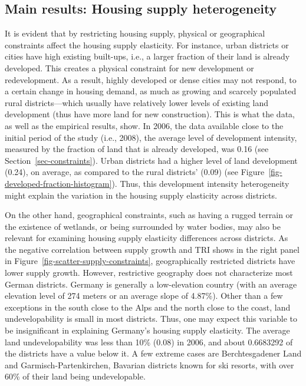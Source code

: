 \documentclass[
  12pt,
]{article}
\begin{document}
\subsection{Main results: Housing supply
heterogeneity}\label{sec-district-heterogeneity}

It is evident that by restricting housing supply, physical or
geographical constraints affect the housing supply elasticity. For
instance, urban districts or cities have high existing built-ups, i.e.,
a larger fraction of their land is already developed. This creates a
physical constraint for new development or redevelopment. As a result,
highly developed or dense cities may not respond, to a certain change in
housing demand, as much as growing and scarcely populated rural
districts---which usually have relatively lower levels of existing land
development (thus have more land for new construction). This is what the
data, as well as the empirical results, show. In 2006, the data
available close to the initial period of the study (i.e., 2008), the
average level of development intensity, measured by the fraction of land
that is already developed, was 0.16 (see Section~\ref{sec-constraints}).
Urban districts had a higher level of land development (0.24), on
average, as compared to the rural districts' (0.09) (see
Figure~\ref{fig-developed-fraction-histogram}). Thus, this development
intensity heterogeneity might explain the variation in the housing
supply elasticity across districts.

On the other hand, geographical constraints, such as having a rugged
terrain or the existence of wetlands, or being surrounded by water
bodies, may also be relevant for examining housing supply elasticity
differences across districts. As the negative correlation between supply
growth and TRI shows in the right panel in
Figure~\ref{fig-scatter-supply-constraints}, geographically restricted
districts have lower supply growth. However, restrictive geography does
not characterize most German districts. Germany is generally a
low-elevation country (with an average elevation level of 274 meters or
an average slope of 4.87\%). Other than a few exceptions in the south
close to the Alps and the north close to the coast, land
undevelopability is small in most districts. Thus, one may expect this
variable to be insignificant in explaining Germany's housing supply
elasticity. The average land undevelopability was less than 10\% (0.08)
in 2006, and about 0.6683292 of the districts have a value below it. A
few extreme cases are Berchtesgadener Land and Garmisch-Partenkirchen,
Bavarian districts known for ski resorts, with over 60\% of their land
being undevelopable.
\end{document}
